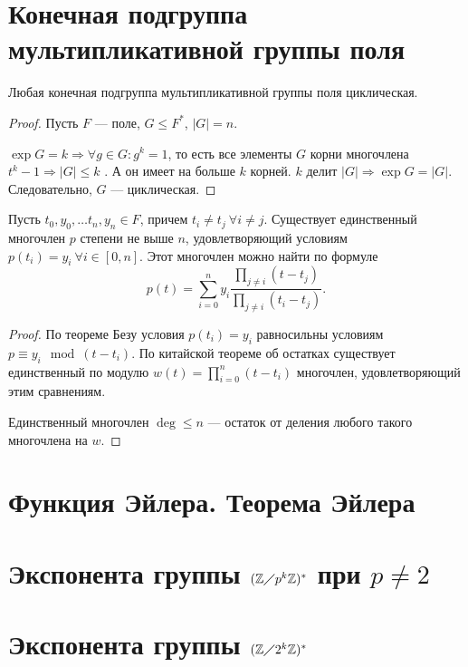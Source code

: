 \documentclass[11pt]{book}
\newcommand{\Z}{\mathbb{Z}}
\newcommand{\po}{\diagup}
\renewcommand{\le}{\leqslant}
\theoremstyle{definition}
\theoremstyle{plain}
\theoremstyle{plain}
\theoremstyle{definition}
\theoremstyle{remark}
\begin{document}
 \section{Конечная подгруппа мультипликативной группы поля}
  \begin{thm}
      Любая конечная подгруппа мультипликативной группы поля циклическая.
 \end{thm}
 \begin{proof}
    Пусть $ F$ --- поле, $ G \le F^{*}$, $ |G| =n $.

     $ \exp G = k \Longrightarrow \forall g \in  G: g^{k } = 1$, то есть все элементы $ G$ корни многочлена $ t ^{k} -1 \Longrightarrow  |G| \le k$ . А он имеет на больше  $ k$ корней. 
     $ k$ делит  $ |G| \Longrightarrow  \exp G = |G|$. Следовательно, $ G$ --- циклическая. 
 \end{proof}
 \begin{thm}
     Пусть $ t_0, y_0, \ldots t_n, y_n \in F$, причем $ t_i \ne  t_j ~ \forall i \ne j$. Существует единственный многочлен $ p$ степени не выше  $ n$, удовлетворяющий условиям  $ p(t_i) = y_i ~ \forall i \in [0, n]$. Этот многочлен можно найти по формуле
     \[
	 p(t) = \sum_{i = 0}^{n} y_i \frac{\prod_{j \ne  i}(t-t_j)}{\prod_{j \ne  i}(t_i - t_j)}
     .\] 
 \end{thm}
 \begin{proof}
     По теореме Безу условия $ p(t_i) = y_i $  равносильны условиям  $ p \equiv y_{i} \mod (t - t_i)$. По китайской теореме об остатках существует единственный по модулю $ w(t) = \prod\limits_{i = 0}^{n}(t-t_i)$ многочлен, удовлетворяющий этим сравнениям.

     Единственный многочлен $ \deg \le n $ --- остаток от деления любого такого многочлена на $ w$.
 \end{proof}
 \section{Функция Эйлера. Теорема Эйлера}
 \section{Экспонента группы $ (\Z \po p^{k}\Z)^{*}$ при $ p \ne  2$ }
 \section{Экспонента группы $ (\Z \po 2^{k}\Z)^{*}$ }
\end{document}
